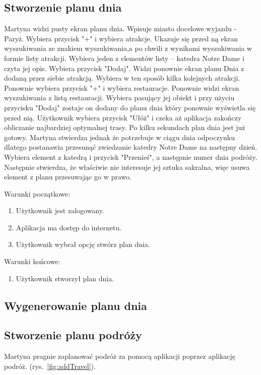 \documentclass[10pt,twoside,a4paper]{report}
\begin{document}
\subsection{Stworzenie planu dnia}
\par Martyna widzi pusty ekran planu dnia. Wpisuje miasto docelowe wyjazdu - Paryż. Wybiera przycisk "+" i wybiera atrakcje. Ukazuje się przed ną ekran wyszukiwania ze znakiem wyszukiwania,a po chwili z wynikami wyszukiwania w formie listy atrakcji. Wybiera jeden z elementów listy – katedra Notre Dame i czyta jej opis. Wybiera przycisk "Dodaj". Widzi ponownie ekran planu Dnia z dodaną przez siebie atrakcją. Wybiera w ten sposób kilka kolejnych atrakcji. Ponownie wybiera przycisk "+" i wybiera restauracje. Ponownie widzi ekran wyszukiwania z listą restauracji. Wybiera pasujący jej obiekt i przy użyciu przycisku "Dodaj" zostaje on dodany do  planu dnia który ponownie wyświetla się przed nią. Użytkownik wybiera przycisk "Ułóż" i czeka aż aplikacja zakończy obliczanie najbardziej optymalnej trasy. Po kilku sekundach plan dnia jest już gotowy. Martyna stwierdza jednak że potrzebuje w ciągu dnia odpoczynku dlatego postanawia przesunąć zwiedzanie katedry Notre Dame na następny dzień. Wybiera element z katedrą i przycisk "Przenieś", a następnie numer dnia podróży. Następnie stwierdza, że właściwie nie interesuje jej sztuka sakralna, więc usuwa element z planu przesuwając go w prawo.

\noindent\newline Warunki początkowe:
\begin{enumerate}
  \item Użytkownik jest zalogowany.
  \item Aplikacja ma dostęp do internetu.
  \item Użytkownik wybrał opcję stwórz plan dnia.
\end{enumerate}

\par
\noindent\newline
Warunki końcowe:
\begin{enumerate}
  \item Użytkownik stworzył plan dnia.
\end{enumerate}

\subsection{Wygenerowanie planu dnia}

\subsection{Stworzenie planu podróży}
\par Martyna pragnie zaplanować podróż za pomocą aplikacji poprzez aplikację podróż.  (rys.~\ref{fig:addTravel}).
\end{document}
